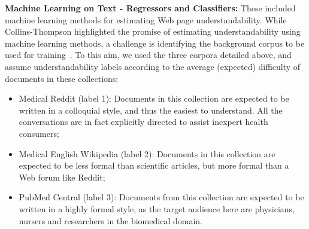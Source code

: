 


\textbf{Machine Learning on Text - Regressors and Classifiers:} These included machine learning methods for estimating Web page understandability. While Collins-Thompson highlighted the promise of estimating understandability using machine learning methods, a challenge is identifying the background corpus to be used for training~\cite{collins2014computational}. To this aim, we used the three corpora detailed above, and assume understandability labels according to the average (expected) difficulty of documents in these collections:




\begin{itemize}
    \item Medical Reddit (label 1): Documents in this collection are expected to be written in a colloquial style, and thus the easiest to understand. All the conversations are in fact explicitly directed to assist inexpert health consumers;
    \item Medical English Wikipedia (label 2): Documents in this collection are expected to be less formal than scientific articles, but more formal than a Web forum like Reddit;
    \item PubMed Central (label 3): Documents from this collection are expected to be written in a highly formal style, as the target audience here are physicians, nursers and researchers in the biomedical domain.
\end{itemize}

